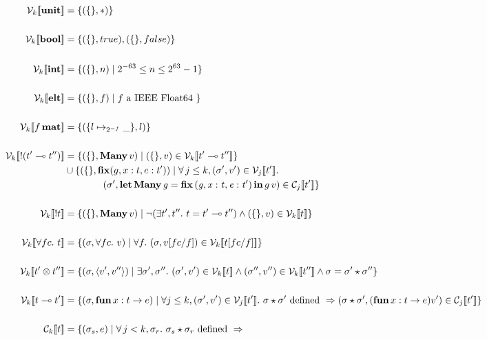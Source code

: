 \documentclass[11pt]{article}%
\newcommand{\den}[3]{ \mathcal{#1}_{#2} [\![ #3 ]\!] }%
\newcommand{\V}[2]{ \den{V}{#1}{#2} }%
\newcommand{\C}[2]{ \den{C}{#1}{#2} }%
\newcommand{\Unit}{\ottkw{unit}}%
\newcommand{\Bang}{\ottkw{!}}
\newcommand{\Bool}{\ottkw{bool}}%
\newcommand{\Int}{\ottkw{int}}%
\newcommand{\Elt}{\ottkw{elt}}%
\newcommand{\Mat}{\ottkw{mat}}%
\newcommand{\Many}{\ottkw{Many}}%
\newcommand{\empH}{\{\}}%
\newcommand{\letManyG}{\ottkw{let} \, \ottkw{Many} \, \mathit{g}  \ottsym{=}  \ottkw{fix} \, \ottsym{(}  \mathit{g}  \ottsym{,}  \mathit{x}  \ottsym{:}  \ottnt{t}  \ottsym{,}  \ottnt{e}  \ottsym{:}  \ottnt{t'}  \ottsym{)} \, \ottkw{in} \, g\, }%
\begin{document}
%
\ottall%

\begin{align*}
  \V{k}{ \Unit } &= \{ (\empH, \ast) \} \\
\\
    \V{k}{ \Bool } &= \{ (\empH, true), (\empH, false) \} \\
\\
    \V{k}{ \Int } &= \{ (\empH, n) \mid 2^{-63} \leq n \leq 2^{63} -1 \} \\
\\
    \V{k}{ \Elt } &= \{ (\empH, f) \mid f \textrm{ a IEEE Float64 } \} \\
\\
    \V{k}{ f \, \Mat } &= \{ (\{ l \mapsto_{2^{-f}} \_ \} , l) \} \\
\\
    \V{k}{ \Bang (t' \multimap t'') } &= \{ (\empH, \Many\, v) \mid (\empH, v) \in \V{k}{ t' \multimap t'' } \} \\
                                      & \cup \{ (\empH, \ottkw{fix} (g, x : t, e : t')) \mid \forall \, j \leq k, (\sigma', v') \in \V{j}{ t' }.\\
                                      & \qquad \qquad (\sigma', \letManyG v) \in \C{j}{ t' } \} \\
\\
    \V{k}{ \Bang t } &= \{ (\empH, \Many\, v) \mid \neg (\exists t', t''.\ t = t' \multimap t'') \wedge (\empH, v) \in \V{k}{t} \} \\
\\
    \V{k}{ \forall fc.\  t } &= \{ (\sigma, \forall fc.\ v) \mid \forall f.\ (\sigma, v [ fc / f ]) \in \V{k}{ t [ fc / f ] } \} \\
\\
    \V{k}{ t' \otimes t'' } &= \{ (\sigma, \langle v', v'' \rangle) \mid \exists \sigma', \sigma'' .\ (\sigma', v') \in \V{k}{ t } \wedge (\sigma'', v'') \in \V{k}{ t''} \wedge \sigma = \sigma' \star \sigma'' \} \\
\\
    \V{k}{ t \multimap t' } &= \{ (\sigma, \ottkw{fun}\, x : t \rightarrow e) \mid \forall j \leq k, (\sigma', v') \in \V{j}{ t' }.\ \sigma \star \sigma' \textrm{ defined } \Rightarrow (\sigma \star \sigma', (\ottkw{fun}\, x : t \rightarrow e) v') \in \C{j}{ t' } \} \\
\\
    \C{k}{ t } &= \{ (\sigma_s, e) \mid \forall \, j < k, \sigma_r.\ \sigma_s \star \sigma_r \textrm{ defined } \Rightarrow \\

\end{align*}
\end{document}
